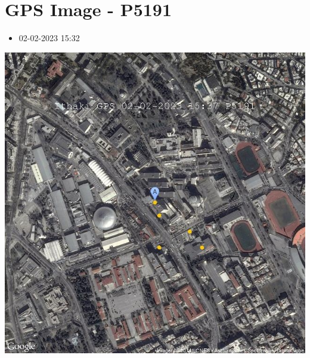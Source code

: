 \documentclass[10pt,a4paper]{article}
\begin{document}
\section*{\textlatin{GPS Image - P5191}}
\begin{itemize}
  \item 02-02-2023 15:32
\end{itemize}
\begin{center}
  \includegraphics[scale=0.4]{gpsImage.jpeg}
  \newline
  \newline
  \newline
  \newline
  \newline
  \newline
\end{center}
\end{document}
